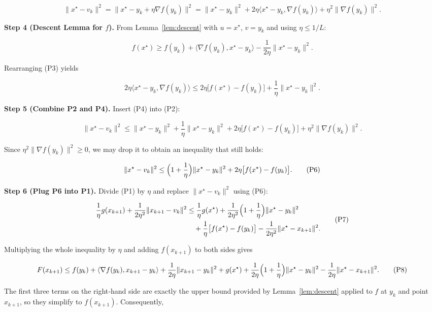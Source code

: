 \documentclass{article}
\begin{document}
\[
\|x^{\star}-v_{k}\|^{2}
= \|x^{\star}-y_{k}+\eta\nabla f(y_{k})\|^{2}
= \|x^{\star}-y_{k}\|^{2}+2\eta\langle x^{\star}-y_{k},\nabla f(y_{k})\rangle
+\eta^{2}\|\nabla f(y_{k})\|^{2}.
\tag{P2}
\]

\bigskip
\noindent\textbf{Step 4 (Descent Lemma for $f$).}  
From Lemma~\ref{lem:descent} with $u=x^{\star}$, $v=y_{k}$ and using $\eta\le1/L$:

\[
f(x^{\star})\ge f(y_{k})+\langle\nabla f(y_{k}),x^{\star}-y_{k}\rangle
-\frac{1}{2\eta}\|x^{\star}-y_{k}\|^{2}.
\tag{P3}
\]

Rearranging (P3) yields  

\[
2\eta\langle x^{\star}-y_{k},\nabla f(y_{k})\rangle
\le 2\eta\bigl[f(x^{\star})-f(y_{k})\bigr]
+\frac{1}{\eta}\|x^{\star}-y_{k}\|^{2}.
\tag{P4}
\]

\bigskip
\noindent\textbf{Step 5 (Combine P2 and P4).}  
Insert (P4) into (P2):

\[
\|x^{\star}-v_{k}\|^{2}
\le \|x^{\star}-y_{k}\|^{2}
+\frac{1}{\eta}\|x^{\star}-y_{k}\|^{2}
+2\eta\bigl[f(x^{\star})-f(y_{k})\bigr]
+\eta^{2}\|\nabla f(y_{k})\|^{2}.
\tag{P5}
\]

Since $\eta^{2}\|\nabla f(y_{k})\|^{2}\ge0$, we may drop it to obtain an inequality
that still holds:

\[
\|x^{\star}-v_{k}\|^{2}
\le \Bigl(1+\frac{1}{\eta}\Bigr)\|x^{\star}-y_{k}\|^{2}
+2\eta\bigl[f(x^{\star})-f(y_{k})\bigr].
\tag{P6}
\]

\bigskip
\noindent\textbf{Step 6 (Plug P6 into P1).}  
Divide (P1) by $\eta$ and replace $\|x^{\star}-v_{k}\|^{2}$ using (P6):

\[
\begin{aligned}
\frac{1}{\eta}g(x_{k+1})+\frac{1}{2\eta^{2}}\|x_{k+1}-v_{k}\|^{2}
&\le \frac{1}{\eta}g(x^{\star})
+\frac{1}{2\eta^{2}}\Bigl(1+\frac{1}{\eta}\Bigr)\|x^{\star}-y_{k}\|^{2} \\
&\quad +\frac{1}{\eta}\bigl[f(x^{\star})-f(y_{k})\bigr]
-\frac{1}{2\eta^{2}}\|x^{\star}-x_{k+1}\|^{2}.
\end{aligned}
\tag{P7}
\]

Multiplying the whole inequality by $\eta$ and adding $f(x_{k+1})$ to both
sides gives

\[
F(x_{k+1})\le f(y_{k})+ \langle\nabla f(y_{k}),x_{k+1}-y_{k}\rangle
+\frac{1}{2\eta}\|x_{k+1}-y_{k}\|^{2}
+g(x^{\star})+\frac{1}{2\eta}\Bigl(1+\frac{1}{\eta}\Bigr)\|x^{\star}-y_{k}\|^{2}
-\frac{1}{2\eta}\|x^{\star}-x_{k+1}\|^{2}.
\tag{P8}
\]

The first three terms on the right‑hand side are exactly the upper bound
provided by Lemma~\ref{lem:descent} applied to $f$ at $y_{k}$ and point $x_{k+1}$,
so they simplify to $f(x_{k+1})$. Consequently,
\end{document}
